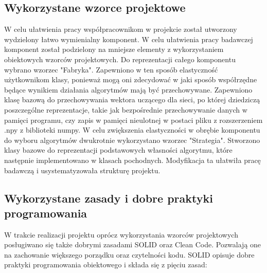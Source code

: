 \documentclass[oneside, eng]{mgr}
\begin{document}
\subsection{Wykorzystane wzorce projektowe}

W celu ułatwienia pracy współpracownikom w projekcie został utworzony wydzielony łatwo wymienialny komponent. W celu ułatwienia pracy badawczej komponent został podzielony na mniejsze elementy z wykorzystaniem obiektowych wzorców projektowych.
Do reprezentacji całego komponentu wybrano wzorzec "Fabryka". Zapewniono w ten sposób elastyczność użytkownikom klasy, ponieważ mogą oni zdecydować w jaki sposób współrzędne będące wynikiem działania algorytmów mają być przechowywane. Zapewniono klasę bazową do przechowywania wektora uczącego dla sieci, po której dziedziczą poszczególne reprezentacje, takie jak bezpośrednie przechowywanie danych w pamięci programu, czy zapis w pamięci nieulotnej w postaci pliku z rozszerzeniem .npy z biblioteki numpy.
W celu zwiększenia elastyczności w obrębie komponentu do wyboru algorytmów dwukrotnie wykorzystano wzorzec "Strategia". Stworzono klasy bazowe do reprezentacji podstawowych własności algorytmu, które następnie implementowano w klasach pochodnych. Modyfikacja ta ułatwiła pracę badawczą i usystematyzowała strukturę projektu.

\subsection{Wykorzystane zasady i dobre praktyki programowania}

W trakcie realizacji projektu oprócz wykorzystania wzorców projektowych posługiwano się także dobrymi zasadami SOLID oraz Clean Code. Pozwalają one na zachowanie większego porządku oraz czytelności kodu. SOLID opisuje dobre praktyki programowania obiektowego i składa się z pięciu zasad:
\end{document}

